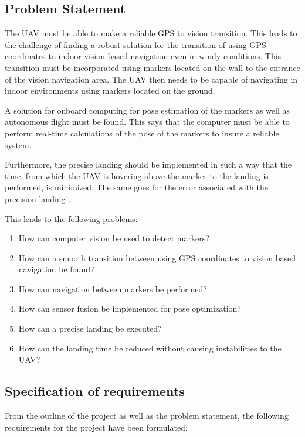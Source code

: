 \documentclass[../Head/report.tex]{subfiles}
\begin{document}
\newpage
\subsection{Problem Statement}

The UAV must be able to make a reliable GPS to vision transition. This leads to the challenge of finding a robust solution for the transition of using GPS coordinates to indoor vision based navigation even in windy conditions. This transition must be incorporated using markers located on the wall to the entrance of the vision navigation area. The UAV then needs to be capable of navigating in indoor environments using markers located on the ground.    

A solution for onboard computing for pose estimation of the markers as well as autonomous flight must be found. This says that the computer must be able to perform real-time calculations of the pose of the markers to insure a reliable system. 

Furthermore, the precise landing should be implemented in such a way that the time, from which the UAV is hovering above the marker to the landing is performed, is minimized. The same goes for the error associated with the precision landing .  

This leads to the following problems:

\begin{enumerate}[label=\textbf{P.\arabic*}]
    \item \label{ps:one} How can computer vision be used to detect markers?
    \item \label{ps:two} How can a smooth transition between using GPS coordinates to vision based navigation be found?
    \item \label{ps:three} How can navigation between markers be performed?
    \item \label{ps:four} How can sensor fusion be implemented for pose optimization?
    \item \label{ps:five} How can a precise landing be executed?
    \item \label{ps:six} How can the landing time be reduced without causing instabilities to the UAV?    
\end{enumerate} 

\subsection{Specification of requirements}

From the outline of the project as well as the problem statement, the following requirements for the project have been formulated:
\end{document}
